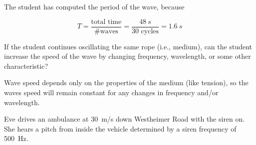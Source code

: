 \documentclass[answers]{exam}
\begin{document}
\begin{questions}
\begin{solutionorbox}
The student has computed the period of the wave, because 

\begin{equation*}
    T = \frac{\text{total time}}{\text{\# waves}} = \frac{\SI{48}{s}}{\text{30 cycles}} = \SI{1.6}{s}
\end{equation*}
\end{solutionorbox}

\fillwithlines{1.4cm}


\question \label{Q4}
If the student continues oscillating the same rope (i.e., medium), can the student increase the speed of the wave by changing frequency, wavelength, or some other characteristic?

\ifprintanswers
{\color{red}
Wave speed depends only on the properties of the medium (like tension), so the waves speed will remain constant for any changes in frequency and/or wavelength. 
}
\fi

\fillwithlines{1.4cm}


\question
Eve drives an ambulance at \SI{30}{m/s} down Westheimer Road with the siren on. She hears a pitch from inside the vehicle determined by a siren frequency of \SI{500}{Hz}. 

\begin{center}
\end{center}

\end{questions}
\end{document}

